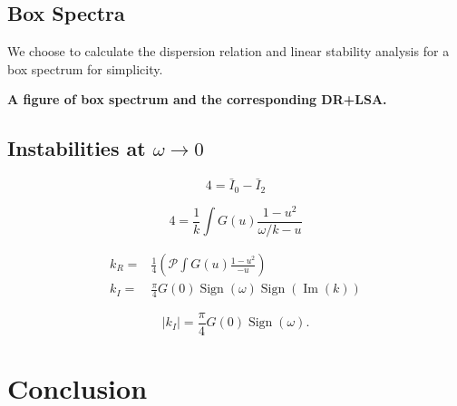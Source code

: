 \documentclass[%
preprint,
 amsmath,amssymb,
 aps,
 prd
]{revtex4-1}
\begin{document}
\subsection{\label{sec-boxspectrum}Box Spectra}

We choose to calculate the dispersion relation and linear stability analysis for a box spectrum for simplicity.


{\color{red}\bf A figure of box spectrum and the corresponding DR+LSA.}


\subsection{\label{sec-omega-to-zero}Instabilities at $\omega\to 0$}

\begin{equation}
   4 = \bar I_0 - \bar I_2
\end{equation}

\begin{equation}
   4 = \frac{1}{k} \int G(u) \frac{ 1 - u^2 }{ \omega/k - u }
\end{equation}

\begin{align}
k_R =& \frac{1}{4}\left(  \mathscr P \int G(u) \frac{ 1 - u^2 }{  - u }  \right) \\
k_I =&  \frac{\pi}{4}G(0) \operatorname{Sign}\left( \omega \right) \operatorname{Sign}\left(  \operatorname{Im}(k)  \right)
\end{align}


\begin{equation}
   \lvert k_I \rvert  =  \frac{\pi}{4}G(0) \operatorname{Sign}\left( \omega \right).
\end{equation}


\section{\label{sec-conclusion}Conclusion}






















\end{document}
